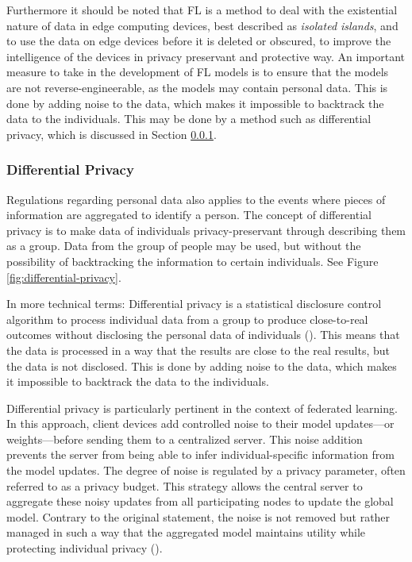 Furthermore it should be noted that FL is a method to deal with the existential nature of data in edge computing devices, best described as \textit{isolated islands}, and to use the data on edge devices before it is deleted or obscured, to improve the intelligence of the devices in privacy preservant and protective way. An important measure to take in the development of FL models is to ensure that the models are not reverse-engineerable, as the models may contain personal data. This is done by adding noise to the data, which makes it impossible to backtrack the data to the individuals. This may be done by a method such as differential privacy, which is discussed in Section \ref{sec:differential-privacy}.

\subsubsection{Differential Privacy}
\label{sec:differential-privacy}
Regulations regarding personal data also applies to the events where pieces of information are aggregated to identify a person. The concept of differential privacy is to make data of individuals privacy-preservant through describing them as a group. Data from the group of people may be used, but without the possibility of backtracking the information to certain individuals. See Figure \ref{fig:differential-privacy}.

In more technical terms: Differential privacy is a statistical disclosure control algorithm to process individual data from a group to produce close-to-real outcomes without disclosing the personal data of individuals (\cite{hu2023metaverse-privacy}). This means that the data is processed in a way that the results are close to the real results, but the data is not disclosed. This is done by adding noise to the data, which makes it impossible to backtrack the data to the individuals.

Differential privacy is particularly pertinent in the context of federated learning. In this approach, client devices add controlled noise to their model updates—or weights—before sending them to a centralized server. This noise addition prevents the server from being able to infer individual-specific information from the model updates. The degree of noise is regulated by a privacy parameter, often referred to as a privacy budget. This strategy allows the central server to aggregate these noisy updates from all participating nodes to update the global model. Contrary to the original statement, the noise is not removed but rather managed in such a way that the aggregated model maintains utility while protecting individual privacy (\cite{sh2023RolwOfWeightTransmissionProtocolinML}).

